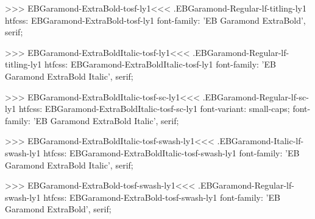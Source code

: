 {{>>>
\<EBGaramond-ExtraBold-tosf-ly1\><<<
.EBGaramond-Regular-lf-titling-ly1
htfcss:  EBGaramond-ExtraBold-tosf-ly1  font-family: 'EB Garamond ExtraBold', serif;

>>>
\<EBGaramond-ExtraBoldItalic-tosf-ly1\><<<
.EBGaramond-Regular-lf-titling-ly1
htfcss:  EBGaramond-ExtraBoldItalic-tosf-ly1  font-family: 'EB Garamond ExtraBold Italic', serif;

>>>
\<EBGaramond-ExtraBoldItalic-tosf-sc-ly1\><<<
.EBGaramond-Regular-lf-sc-ly1
htfcss:  EBGaramond-ExtraBoldItalic-tosf-sc-ly1  font-variant: small-caps; font-family: 'EB Garamond ExtraBold Italic', serif;

>>>
\<EBGaramond-ExtraBoldItalic-tosf-swash-ly1\><<<
.EBGaramond-Italic-lf-swash-ly1
htfcss:  EBGaramond-ExtraBoldItalic-tosf-swash-ly1  font-family: 'EB Garamond ExtraBold Italic', serif;

>>>
\<EBGaramond-ExtraBold-tosf-swash-ly1\><<<
.EBGaramond-Regular-lf-swash-ly1
htfcss:  EBGaramond-ExtraBold-tosf-swash-ly1  font-family: 'EB Garamond ExtraBold', serif;

}}
